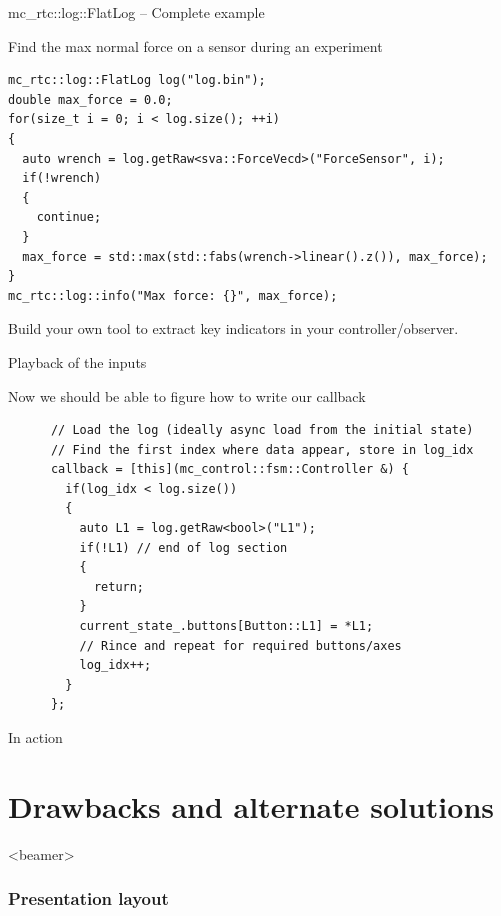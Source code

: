 \documentclass[c,aspectratio=169]{beamer}
\begin{document}
\begin{frame}[fragile]{mc\_rtc::log::FlatLog -- Complete example}

  \begin{block}{Find the max normal force on a sensor during an experiment}
    \scriptsize
    \begin{verbatim}
mc_rtc::log::FlatLog log("log.bin");
double max_force = 0.0;
for(size_t i = 0; i < log.size(); ++i)
{
  auto wrench = log.getRaw<sva::ForceVecd>("ForceSensor", i);
  if(!wrench)
  {
    continue;
  }
  max_force = std::max(std::fabs(wrench->linear().z()), max_force);
}
mc_rtc::log::info("Max force: {}", max_force);
    \end{verbatim}
  \end{block}

  Build your own tool to extract key indicators in your controller/observer.

\end{frame}

\begin{frame}[fragile]{Playback of the inputs}
  \begin{block}{Now we should be able to figure how to write our callback}
    \scriptsize
    \begin{verbatim}
      // Load the log (ideally async load from the initial state)
      // Find the first index where data appear, store in log_idx
      callback = [this](mc_control::fsm::Controller &) {
        if(log_idx < log.size())
        {
          auto L1 = log.getRaw<bool>("L1");
          if(!L1) // end of log section
          {
            return;
          }
          current_state_.buttons[Button::L1] = *L1;
          // Rince and repeat for required buttons/axes
          log_idx++;
        }
      };
    \end{verbatim}
  \end{block}
\end{frame}

\begin{frame}{In action}
\end{frame}

\section{Drawbacks and alternate solutions}

\begin{frame}<beamer>
  \frametitle{Presentation layout}
  \setcounter{tocdepth}{2}
\end{frame}
\end{document}

